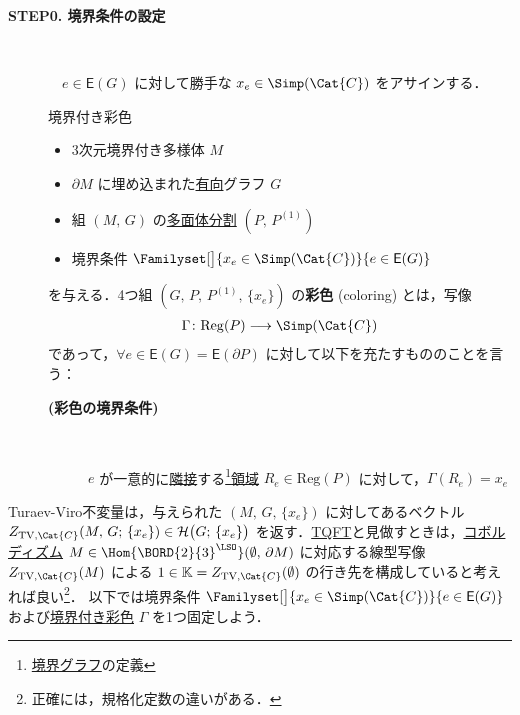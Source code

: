 \documentclass[TQFT_main]{subfiles}
\begin{document}
\begin{description}
    \item[\textbf{STEP0. 境界条件の設定}]　
    
    　$e \in \mathsf{E}(G)$ に対して勝手な $x_e \in \Simp(\Cat{C})$ をアサインする．

    \begin{mydef}[label=def:coloring-bdy]{境界付き彩色}
        \begin{itemize}
            \item 3次元境界付き多様体 $M$
            \item $\partial M$ に埋め込まれた\underline{有向}グラフ $G$
            \item 組 $(M,\, G)$ の\hyperref[def:polytope-decomp]{多面体分割} $(P,\, P^{(1)})$ 
            \item 境界条件 $\Familyset[\big]{x_e \in \Simp(\Cat{C})}{e \in \mathsf{E}(G)}$
        \end{itemize}
        を与える．4つ組 $(G,\, P,\, P^{(1)},\, \{x_e\})$ の\textbf{彩色} (coloring) とは，写像
        \begin{align}
            \Gamma \colon \mathrm{Reg} (P) \lto \Simp(\Cat{C})
        \end{align}
        であって，$\forall e \in \mathsf{E}(G) = \mathsf{E}(\partial P)$ に対して以下を充たすもののことを言う：

        \begin{description}
            \item[\textbf{(彩色の境界条件)}]　
            
            $e$ が一意的に\hyperref[def:polyhedron]{隣接}する\footnote{\hyperref[def:graph-bdy]{境界グラフ}の定義}\hyperref[def:polyhedron]{領域} $R_e \in \mathrm{Reg}(P)$ に対して，$\Gamma(R_e) = x_e$
        \end{description}
        
    \end{mydef}
\end{description}

Turaev-Viro不変量は，与えられた $(M,\, G,\, \{x_e\})$ に対してあるベクトル $Z_{\text{TV},\Cat{C}} (M,\, G;\, \{x_e\}) \in \mathcal{H}\bigl(G;\, \{x_e\}\bigr)$ を返す．\hyperref[def:TQFT]{TQFT}と見做すときは，\hyperref[ex:Bord]{コボルディズム} $M \in \Hom{\BORD{2}{3}^{\LSO}} (\emptyset,\, \partial M)$ に対応する線型写像 $Z_{\text{TV},\Cat{C}} (M)$ による $1 \in \mathbb{K} = Z_{\text{TV},\Cat{C}} (\emptyset)$ の行き先を構成していると考えれば良い\footnote{正確には，規格化定数の違いがある．}．
以下では境界条件 $\Familyset[\big]{x_e \in \Simp(\Cat{C})}{e \in \mathsf{E}(G)}$ および\hyperref[def:coloring-bdy]{境界付き彩色} $\Gamma$ を1つ固定しよう．
\end{document}
